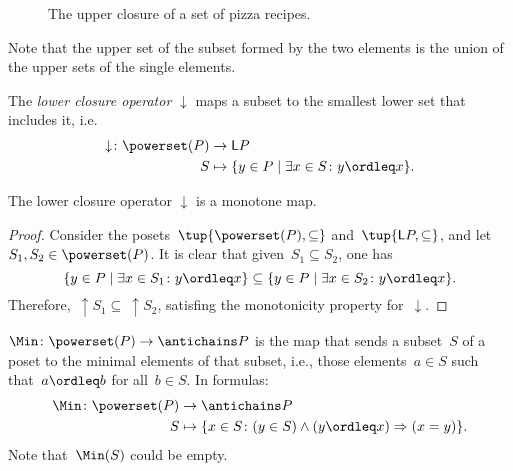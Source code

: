 \begin{figure}[h!]
\begin{center}
\end{center}
\caption{The upper closure of a set of pizza recipes. \label{fig:upperclosure_2}}
\end{figure}
Note that the upper set of the subset formed by the two elements is the union of the upper sets of the single elements.

\begin{definition}
The \emph{lower closure operator} $\downarrow$ maps a subset to the smallest lower set that includes it, i.e.
\begin{equation}
    \begin{aligned}
    \downarrow\colon \powerset(P)&\to \mathsf{L}P\\
    S&\mapsto \{ y\in P \mid \exists x\in S \colon y\ordleq x\}.
    \end{aligned}
\end{equation}
\end{definition}

\begin{lemma}
The lower closure operator $\downarrow$ is a monotone map.
\end{lemma}
\begin{proof}
Consider the posets~$\tup{\powerset(P),\subseteq}$ and~$\tup{\mathsf{L}P,\subseteq}$, and let~$S_1,S_2\in \powerset(P)$. It is clear that given~$S_1\subseteq S_2$, one has
\begin{equation}
    \{y\in P\mid \exists x\in S_1\colon y\ordleq x\} \subseteq \{y\in P\mid \exists x\in S_2\colon y\ordleq x\}.
\end{equation}
Therefore,~$\uparrow S_1\subseteq \ \uparrow S_2$, satisfing the monotonicity property for~$\downarrow$.
\end{proof}

\begin{definition}[Min]
\label{def:Min}
$\Min \colon \powerset(P) \to \antichains P$ is the map that sends a subset~$S$ of a poset to the minimal elements of that subset, i.e., those elements~$a \in S$ such that~$a \ordleq b$ for all~$b \in S$. In formulas:
\begin{equation}
    \begin{aligned}
    \Min \colon \powerset(P) &\to \antichains P\\
    S&\mapsto \{ x\in S\colon (y\in S)\wedge(y\ordleq x)\Rightarrow (x=y)\}.
    \end{aligned}
\end{equation}
Note that~$\Min(S)$ could be empty.
\end{definition}

